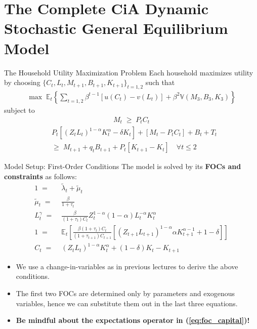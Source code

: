 \documentclass[10pt,c,aspectratio=1610,handout]{beamer}
\begin{document}
\section{The Complete CiA Dynamic Stochastic General Equilibrium Model}%
\begin{frame}{The Household Utility Maximization Problem}%
  Each household maximizes utility by choosing $\{ C_t, L_t, M_{t+1}, B_{t+1}, K_{t+1} \}_{t=1,2}$ such that%
  \begin{align*}%
    \max \; \mathbb{E}_t \left\{ \sum_{t=1,2} \beta^{t-1} \left[ u(C_t) - v(L_t) \right] + \beta^2 \mathbb{V} \left(M_3,B_3,K_3\right) \right\}%
  \end{align*}%
  subject to%
  \begin{align*}%
    M_t \; \geq \; P_t C_t%
  \end{align*}%
  \pause%
  \begin{align*}%
    & P_t \left[ \left(Z_t L_t\right)^{1-\alpha} K_t^\alpha - \delta K_t \right] + \left[ M_t - P_t C_t \right] + B_t + T_t\\%
    & \geq \; M_{t+1} + q_t B_{t+1} + P_t \left[ K_{t+1} - K_t \right] \quad \forall t \leq 2%
  \end{align*}%
\end{frame}%
\begin{frame}{Model Setup: First-Order Conditions}%
  The model is solved by its \textbf{FOCs and constraints} as follows:%
  \begin{align}%
    1 \; = & \;\tilde{\lambda}_t + \tilde{\mu}_t\\%
    \tilde{\mu}_t \; = & \; \frac{\beta}{1+\tau_t}\\%
    L_t^{\gamma} \; = & \; \frac{\beta}{\left(1+\tau_t\right) C_t} Z_t^{1-\alpha} \left(1-\alpha\right) L_t^{-\alpha} K_t^{\alpha}\\%
    1 \; = & \; \mathbb{E}_t \left[ \frac{\beta\left(1+\tau_t\right)C_t}{\left(1+\tau_{t+1}\right)C_{t+1}} \left[ \left(Z_{t+1}L_{t+1}\right)^{1-\alpha} \alpha K_{t+1}^{\alpha-1} + 1 - \delta \right] \right]\label{eq:foc_capital}\\%
    C_t \; = & \; \left(Z_t L_t\right)^{1-\alpha} K_t^\alpha + (1-\delta) K_t - K_{t+1}%
  \end{align}%
  \vspace*{-0.2in}%
  \pause%
  \begin{itemize}%
    \item[$\blacktriangleright$] We use a change-in-variables as in previous lectures to derive the above conditions.%
    \item[$\blacktriangleright$] The first two FOCs are determined only by parameters and exogenous variables, hence we can substitute them out in the last three equations.%
    \item[$\blacktriangleright$] \alert{\textbf{Be mindful about the expectations operator in (\ref{eq:foc_capital})!}}%
  \end{itemize}%
\end{frame}%
\end{document}
